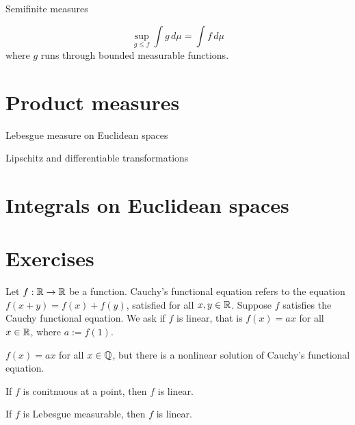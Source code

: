 \documentclass{../../large}
\begin{document}
\begin{prb}
\end{prb}

\begin{prb}
Semifinite measures
\begin{parts}
\item
\[\sup_{g\le f}\int g\,d\mu=\int f\,d\mu\]
where $g$ runs through bounded measurable functions.
\item
\end{parts}
\end{prb}


\section{Product measures}

\begin{prb}
Lebesgue measure on Euclidean spaces
\end{prb}


Lipschitz and differentiable transformations



\section{Integrals on Euclidean spaces}




\section*{Exercises}
\begin{prb}
Let $f:\mathbb{R}\to\mathbb{R}$ be a function.
Cauchy's functional equation refers to the equation $f(x+y)=f(x)+f(y)$, satisfied for all $x,y\in\mathbb{R}$.
Suppose $f$ satisfies the Cauchy functional equation.
We ask if $f$ is linear, that is $f(x)=ax$ for all $x\in\mathbb{R}$, where $a:=f(1)$.
\begin{parts}
\item $f(x)=ax$ for all $x\in\mathbb{Q}$, but there is a nonlinear solution of Cauchy's functional equation.
\item If $f$ is conitnuous at a point, then $f$ is linear.
\item If $f$ is Lebesgue measurable, then $f$ is linear.
\end{parts}
\end{prb}
\end{document}
